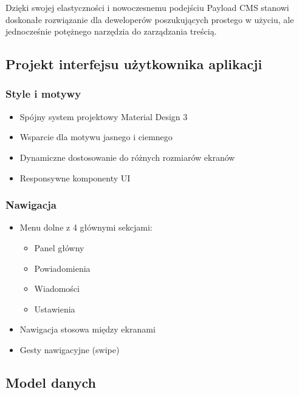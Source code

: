 Dzięki swojej elastyczności i nowoczesnemu podejściu Payload CMS stanowi doskonałe rozwiązanie dla deweloperów poszukujących prostego w użyciu, ale jednocześnie potężnego narzędzia do zarządzania treścią.

\subsection{Projekt interfejsu użytkownika aplikacji}

\subsubsection{Style i motywy}
\begin{itemize}
	\item Spójny system projektowy Material Design 3
	\item Wsparcie dla motywu jasnego i ciemnego
	\item Dynamiczne dostosowanie do różnych rozmiarów ekranów
	\item Responsywne komponenty UI
\end{itemize}

\subsubsection{Nawigacja}
\begin{itemize}
	\item Menu dolne z 4 głównymi sekcjami:
	      \begin{itemize}
		      \item Panel główny
		      \item Powiadomienia
		      \item Wiadomości
		      \item Ustawienia
	      \end{itemize}
	\item Nawigacja stosowa między ekranami
	\item Gesty nawigacyjne (swipe)
\end{itemize}

\subsection{Model danych}

